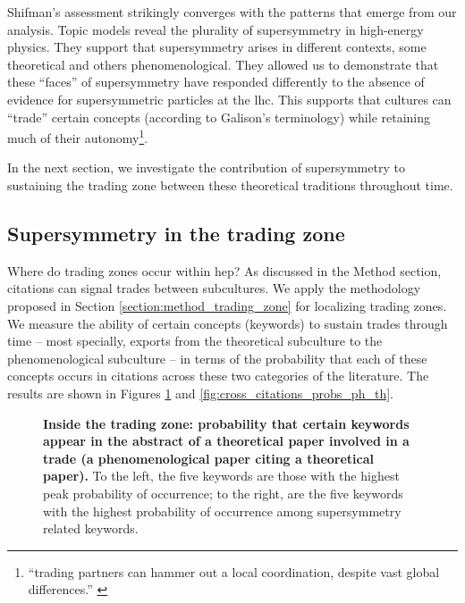 \documentclass[smallextended]{svjour3}
\begin{document}
Shifman's assessment strikingly converges with the patterns that emerge from our analysis. Topic models reveal the plurality of supersymmetry in high-energy physics. They support that supersymmetry arises in different contexts, some theoretical and others phenomenological. They allowed us to demonstrate that these ``faces'' of supersymmetry have responded differently to the absence of evidence for supersymmetric particles at the \gls{lhc}. This supports that cultures can ``trade'' certain concepts (according to Galison's terminology) while retaining much of their autonomy\footnote{``trading partners can hammer out a local coordination, despite vast global differences.'' \citep[p.~783]{galison1997image}}.


In the next section, we investigate the contribution of supersymmetry to sustaining the trading zone between these theoretical traditions throughout time.

\subsection{Supersymmetry in the trading zone}

Where do trading zones occur within \gls{hep}? As discussed in the Method section, citations can signal trades between subcultures. We apply the methodology proposed in Section \ref{section:method_trading_zone} for localizing trading zones. We measure the ability of certain concepts (keywords) to sustain trades through time -- most specially, exports from the theoretical subculture to the phenomenological subculture -- in terms of the probability that each of these concepts occurs in citations across these two categories of the literature. The results are shown in Figures \ref{fig:cross_citations_probs_th_ph} and \ref{fig:cross_citations_probs_ph_th}.

\begin{figure}
    \centering
    
    \caption{\textbf{Inside the trading zone: probability that certain keywords appear in the abstract of a theoretical paper involved in a trade (a phenomenological paper citing a theoretical paper).} To the left, the five keywords are those with the highest peak probability of occurrence; to the right, are the five keywords with the highest probability of occurrence among supersymmetry related keywords.} 
    \label{fig:cross_citations_probs_th_ph}
\end{figure}
\end{document}

